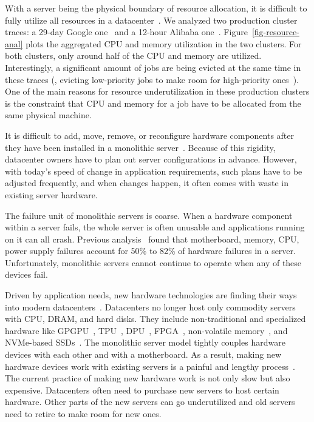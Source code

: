 \documentclass[10pt,times,twocolumn]{z2-article}
\begin{document}
With a server being the physical boundary of resource allocation, 
it is difficult to fully utilize all resources in a datacenter~\cite{Barroso-COMPUTER,Quasar-ASPLOS,PowerNap}.
We analyzed two production cluster traces: a 29-day Google one~\cite{GoogleTrace}
and a 12-hour Alibaba one~\cite{AliTrace}.
Figure~\ref{fig-resource-anal} plots the aggregated CPU and memory utilization in the two clusters.
For both clusters, only around half of the CPU and memory are utilized.
Interestingly, %
a significant amount of jobs are being evicted at the same time in these traces
(\eg, evicting low-priority jobs to make room for high-priority ones~\cite{Borg}). %
One of the main reasons for resource underutilization in these production clusters is 
the constraint that CPU and memory for a job have to be allocated from 
the same physical machine.

It is difficult to add, move, remove, or reconfigure hardware components
after they have been installed in a monolithic server~\cite{FB-Wedge100}. %
Because of this rigidity, datacenter owners have to plan out server configurations in advance.
However, with today's speed of change in application requirements, such plans have to be adjusted frequently,
and when changes happen, it often comes with waste in existing server hardware.

The failure unit of monolithic servers is coarse.
When a hardware component within a server fails, %
the whole server is often unusable and applications running on it can all crash.
Previous analysis~\cite{Failure-Disk-FAST07} found that motherboard, memory, CPU, power supply failures account for 
50\% to 82\% of hardware failures in a server.
Unfortunately, monolithic servers cannot continue to operate when any of these devices fail.


Driven by application needs, new hardware technologies are finding their ways into modern datacenters~\cite{sigarch-dc}.
Datacenters no longer host only commodity servers with CPU, DRAM, and hard disks. 
They include non-traditional and specialized hardware like GPGPU~\cite{GPU-google,GPU-aws}, 
TPU~\cite{TPU}, 
DPU~\cite{DPU},
FPGA~\cite{Putnam14-FPGA,Amazon-F1}, %
non-volatile memory~\cite{Intel3DXpoint}, %
and NVMe-based SSDs~\cite{everspin}.
The monolithic server model tightly couples hardware devices with each other and with a motherboard.
As a result, making new hardware devices work with existing servers is a painful and lengthy process~\cite{Putnam14-FPGA}.
The current practice of making new hardware work is not only slow but also expensive.
Datacenters often need to purchase new servers to host certain hardware.
Other parts of the new servers can go underutilized 
and old servers need to retire to make room for new ones.
\end{document}
